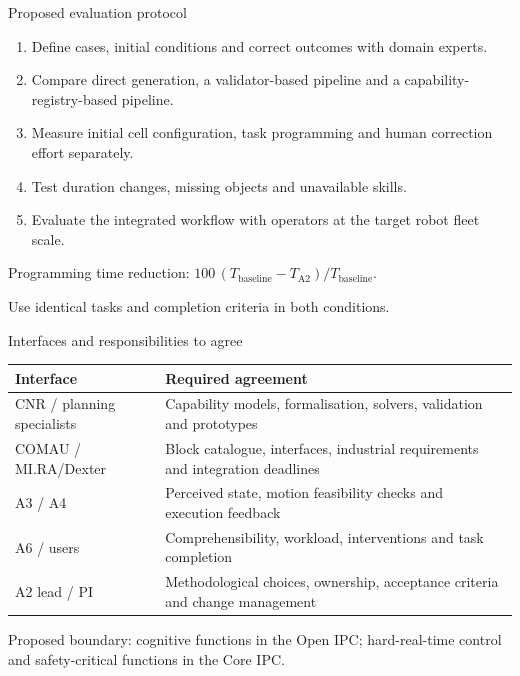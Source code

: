 \documentclass[aspectratio=169,10pt]{beamer}
\begin{document}
\begin{frame}{Proposed evaluation protocol}
\begin{enumerate}\items
\item Define cases, initial conditions and correct outcomes with domain experts.
\item Compare direct generation, a validator-based pipeline and a capability-registry-based pipeline.
\item Measure initial cell configuration, task programming and human correction effort separately.
\item Test duration changes, missing objects and unavailable skills.
\item Evaluate the integrated workflow with operators at the target robot fleet scale.
\end{enumerate}
\small
Programming time reduction: $100\,(T_{\mathrm{baseline}}-T_{\mathrm{A2}})/T_{\mathrm{baseline}}$.\par
Use identical tasks and completion criteria in both conditions.
\end{frame}

\begin{frame}{Interfaces and responsibilities to agree}
\small\renewcommand{\arraystretch}{1.2}
\begin{tabularx}{\textwidth}{@{}>{\raggedright\arraybackslash}p{}X@{}}
\toprule
Interface & Required agreement\\\midrule
CNR / planning specialists & Capability models, formalisation, solvers, validation and prototypes\\
COMAU / MI.RA/Dexter & Block catalogue, interfaces, industrial requirements and integration deadlines\\
A3 / A4 & Perceived state, motion feasibility checks and execution feedback\\
A6 / users & Comprehensibility, workload, interventions and task completion\\
A2 lead / PI & Methodological choices, ownership, acceptance criteria and change management\\\bottomrule
\end{tabularx}
\par\vspace{3mm}
Proposed boundary: cognitive functions in the Open IPC; hard-real-time control and safety-critical functions in the Core IPC.
\end{frame}
\end{document}
